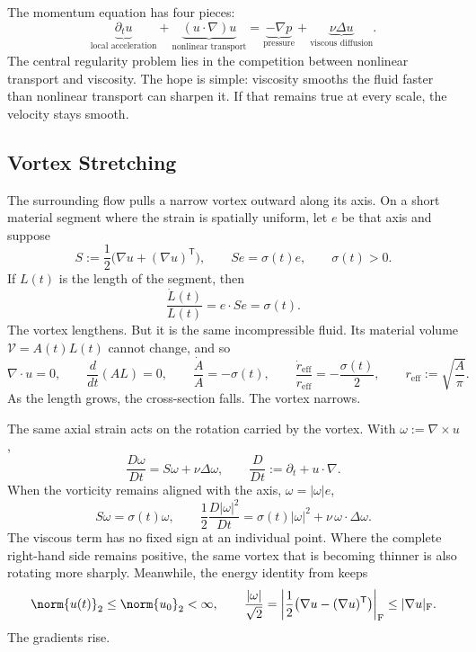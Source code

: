 
The momentum equation has four pieces:
\[
  \underbrace{\partial_t u}_{\text{local acceleration}}
  +
  \underbrace{(u\cdot\nabla)u}_{\text{nonlinear transport}}
  =
  \underbrace{-\nabla p}_{\text{pressure}}
  +
  \underbrace{\nu\Delta u}_{\text{viscous diffusion}}.
\]
The central regularity problem lies in the competition between nonlinear transport and viscosity.
The hope is simple: viscosity smooths the fluid faster than nonlinear transport can sharpen it.
If that remains true at every scale, the velocity stays smooth.

\subsection{Vortex Stretching}\label{sub:ThePerfectlyStretchingVortex}

The surrounding flow pulls a narrow vortex outward along its axis.
On a short material segment where the strain is spatially uniform, let \(e\) be that axis and suppose
\[
  S:=\frac12\bigl(\nabla u+(\nabla u)^{\mathsf T}\bigr),
  \qquad
  Se=\sigma(t)e,
  \qquad
  \sigma(t)>0.
\]
If \(L(t)\) is the length of the segment, then
\[
  \frac{\dot L(t)}{L(t)}
  =
  e\cdot Se
  =
  \sigma(t).
\]
The vortex lengthens.
But it is the same incompressible fluid.
Its material volume \(\mathcal V=A(t)L(t)\) cannot change, and so
\[
  \nabla\cdot u=0,
  \qquad
  \frac{d}{dt}(A L)=0,
  \qquad
  \frac{\dot A}{A}=-\sigma(t),
  \qquad
  \frac{\dot r_{\mathrm{eff}}}{r_{\mathrm{eff}}}
  =
  -\frac{\sigma(t)}{2},
  \qquad
  r_{\mathrm{eff}}:=\sqrt{\frac{A}{\pi}}.
\]
As the length grows, the cross-section falls.
The vortex narrows.

The same axial strain acts on the rotation carried by the vortex.
With \(\omega:=\nabla\times u\),
\[
  \frac{D\omega}{Dt}
  =
  S\omega+\nu\Delta\omega,
  \qquad
  \frac{D}{Dt}
  :=
  \partial_t+u\cdot\nabla.
\]
When the vorticity remains aligned with the axis, \(\omega=|\omega|e\),
\[
  S\omega
  =
  \sigma(t)\omega,
  \qquad
  \frac12\frac{D|\omega|^2}{Dt}
  =
  \sigma(t)|\omega|^2
  +
  \nu\,\omega\cdot\Delta\omega.
\]
The viscous term has no fixed sign at an individual point.
Where the complete right-hand side remains positive, the same vortex that is becoming thinner is also rotating more sharply.
Meanwhile, the energy identity from  keeps
\[
  \norm{u(t)}_2
  \leq
  \norm{u_0}_2
  <
  \infty,
  \qquad
  \frac{|\omega|}{\sqrt2}
  =
  \left|\frac12\bigl(\nabla u-(\nabla u)^{\mathsf T}\bigr)\right|_{\mathrm F}
  \leq
  |\nabla u|_{\mathrm F}.
\]
The gradients rise.

